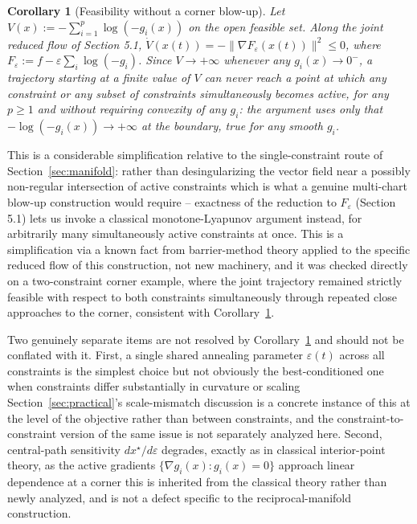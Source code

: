 \documentclass[11pt,onecolumn]{article}
\newtheorem{corollary}[theorem]{Corollary}
\theoremstyle{definition}
\theoremstyle{remark}
\begin{document}
\begin{corollary}[Feasibility without a corner blow-up] \label{cor:corner}
Let $V(x) := -\sum_{i=1}^p \log(-g_i(x))$ on the open feasible set. Along the joint reduced
flow of Section 5.1, $\dot V(x(t)) = -\|\nabla F_\varepsilon(x(t))\|^2 \le 0$, where
$F_\varepsilon := f - \varepsilon \sum_i \log(-g_i)$. Since $V \to +\infty$ whenever any
$g_i(x) \to 0^-$, a trajectory starting at a finite value of $V$ can never reach a point at
which any constraint or any subset of constraints simultaneously  becomes active, for any
$p \ge 1$ and without requiring convexity of any $g_i$: the argument uses only that
$-\log(-g_i(x)) \to +\infty$ at the boundary, true for any smooth $g_i$.
\end{corollary}

This is a considerable simplification relative to the single-constraint route of
Section~\ref{sec:manifold}: rather than desingularizing the vector field near a possibly
non-regular intersection of active constraints which is what a genuine multi-chart blow-up
construction would require -- exactness of the reduction to $F_\varepsilon$ (Section 5.1) lets
us invoke a classical monotone-Lyapunov argument instead, for arbitrarily many simultaneously
active constraints at once. This is a simplification via a known fact from barrier-method
theory applied to the specific reduced flow of this construction, not new machinery, and it was
checked directly on a two-constraint corner example, where the joint trajectory remained
strictly feasible with respect to both constraints simultaneously through repeated close
approaches to the corner, consistent with Corollary~\ref{cor:corner}.

Two genuinely separate items are not resolved by Corollary~\ref{cor:corner} and should not be
conflated with it. First, a single shared annealing parameter $\varepsilon(t)$ across all
constraints is the simplest choice but not obviously the best-conditioned one when constraints
differ substantially in curvature or scaling Section~\ref{sec:practical}'s scale-mismatch
discussion is a concrete instance of this at the level of the objective rather than between
constraints, and the constraint-to-constraint version of the same issue is not separately
analyzed here. Second, central-path sensitivity $dx^\star/d\varepsilon$ degrades, exactly as in
classical interior-point theory, as the active gradients $\{\nabla g_i(x) : g_i(x) = 0\}$
approach linear dependence at a corner this is inherited from the classical theory rather
than newly analyzed, and is not a defect specific to the reciprocal-manifold construction.
\end{document}
